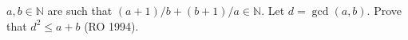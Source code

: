 $a, b \in \mathbb{N}$ are such that $(a + 1)/b + (b + 1)/a \in \mathbb{N}$. Let $d = \gcd(a, b)$. Prove that $d^2 \leq a + b$ (RO 1994).
